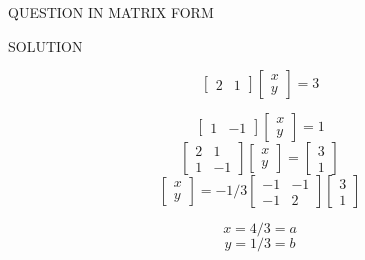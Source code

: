 \documentclass[10pt]{beamer}
\begin{document}
{\begin{frame}{QUESTION IN MATRIX FORM}
 
\end{frame}
\begin{frame}{SOLUTION}

 
    \[
\begin{bmatrix}
2 & 1
\end{bmatrix}
\begin{bmatrix}
x\\
y
\end{bmatrix}
=3

\]

 \[
\begin{bmatrix}
1 & -1
\end{bmatrix}
\begin{bmatrix}
x\\
y
\end{bmatrix}
=1

\]
 \[
\begin{bmatrix}
2 & 1\\
1 & -1
\end{bmatrix}
\begin{bmatrix}
x\\
y
\end{bmatrix}
=
\begin{bmatrix}
3\\
1
\end{bmatrix}

\]
 \[
\begin{bmatrix}
x\\
y
\end{bmatrix}
=-1/3
\begin{bmatrix}
-1 & -1\\
-1 & 2

\end{bmatrix}
\begin{bmatrix}
3\\
1
\end{bmatrix}

\]

\begin{equation}
x=4/3=a 
\end{equation}
\begin{equation}
y=1/3=b 
\end{equation}


\end{frame}}
\end{document}
